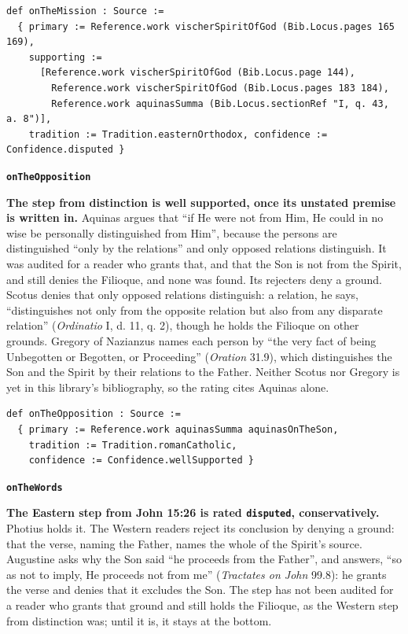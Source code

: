 \documentclass[11pt,paper=\testimonypaper,DIV=13,parskip=false]{scrartcl}
\begin{document}
{\small\begin{verbatim}
def onTheMission : Source :=
  { primary := Reference.work vischerSpiritOfGod (Bib.Locus.pages 165 169),
    supporting :=
      [Reference.work vischerSpiritOfGod (Bib.Locus.page 144),
        Reference.work vischerSpiritOfGod (Bib.Locus.pages 183 184),
        Reference.work aquinasSumma (Bib.Locus.sectionRef "I, q. 43, a. 8")],
    tradition := Tradition.easternOrthodox, confidence := Confidence.disputed }
\end{verbatim}}
\par\medskip\noindent\textbf{\texttt{on\allowbreak{}The\allowbreak{}Opposition}}\par\nobreak\noindent
\textbf{The step from distinction is well supported, once its unstated premise is written in.} Aquinas argues that “if He were not from Him, He could in no wise be personally distinguished from Him”, because the persons are distinguished “only by the relations” and only opposed relations distinguish. It was audited for a reader who grants that, and that the Son is not from the Spirit, and still denies the Filioque, and none was found. Its rejecters deny a ground. Scotus denies that only opposed relations distinguish: a relation, he says, “distinguishes not only from the opposite relation but also from any disparate relation” (\emph{Ordinatio} I, d. 11, q. 2), though he holds the Filioque on other grounds. Gregory of Nazianzus names each person by “the very fact of being Unbegotten or Begotten, or Proceeding” (\emph{Oration} 31.9), which distinguishes the Son and the Spirit by their relations to the Father. Neither Scotus nor Gregory is yet in this library’s bibliography, so the rating cites Aquinas alone.

{\small\begin{verbatim}
def onTheOpposition : Source :=
  { primary := Reference.work aquinasSumma aquinasOnTheSon,
    tradition := Tradition.romanCatholic,
    confidence := Confidence.wellSupported }
\end{verbatim}}
\par\medskip\noindent\textbf{\texttt{on\allowbreak{}The\allowbreak{}Words}}\par\nobreak\noindent
\textbf{The Eastern step from John 15:26 is rated \texttt{disputed}, conservatively.} Photius holds it. The Western readers reject its conclusion by denying a ground: that the verse, naming the Father, names the whole of the Spirit’s source. Augustine asks why the Son said “he proceeds from the Father”, and answers, “so as not to imply, He proceeds not from me” (\emph{Tractates on John} 99.8): he grants the verse and denies that it excludes the Son. The step has not been audited for a reader who grants that ground and still holds the Filioque, as the Western step from distinction was; until it is, it stays at the bottom.
\end{document}

